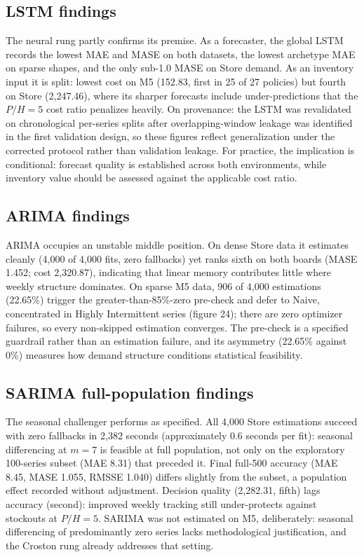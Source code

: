 \subsection{LSTM findings}
\label{sec:lstm-find}
The neural rung partly confirms its premise. As a forecaster, the global LSTM
records the lowest MAE and MASE on both datasets, the lowest archetype MAE on
sparse shapes, and the only sub-1.0 MASE on Store demand. As an inventory
input it is split: lowest cost on M5 (152.83, first in 25 of 27 policies) but
fourth on Store (2,247.46), where its sharper forecasts include
under-predictions that the $P/H=5$ cost ratio penalizes heavily. On
provenance: the LSTM was revalidated on chronological per-series splits after
overlapping-window leakage was identified in the first validation design, so
these figures reflect generalization under the corrected protocol rather than
validation leakage. For practice, the implication is conditional: forecast
quality is established across both environments, while inventory value should
be assessed against the applicable cost ratio.

\subsection{ARIMA findings}
\label{sec:arima-find}
ARIMA occupies an unstable middle position. On dense Store data it estimates
cleanly (4,000 of 4,000 fits, zero fallbacks) yet ranks sixth on both boards
(MASE 1.452; cost 2,320.87), indicating that linear memory contributes little
where weekly structure dominates. On sparse M5 data, 906 of 4,000 estimations
(22.65\%) trigger the greater-than-85\%-zero pre-check and defer to Naive,
concentrated in Highly Intermittent series (figure 24); there are
zero optimizer failures, so every non-skipped estimation converges. The
pre-check is a specified guardrail rather than an estimation failure, and its
asymmetry (22.65\% against 0\%) measures how demand structure conditions
statistical feasibility.

\subsection{SARIMA full-population findings}
\label{sec:sarima-find}
The seasonal challenger performs as specified. All 4,000 Store estimations
succeed with zero fallbacks in 2,382 seconds (approximately 0.6 seconds per
fit): seasonal differencing at $m=7$ is feasible at full population, not only
on the exploratory 100-series subset (MAE 8.31) that preceded it. Final
full-500 accuracy (MAE 8.45, MASE 1.055, RMSSE 1.040) differs slightly from
the subset, a population effect recorded without adjustment. Decision quality
(2,282.31, fifth) lags accuracy (second): improved weekly tracking still
under-protects against stockouts at $P/H=5$. SARIMA was not estimated on M5,
deliberately: seasonal differencing of predominantly zero series lacks
methodological justification, and the Croston rung already addresses that
setting.

